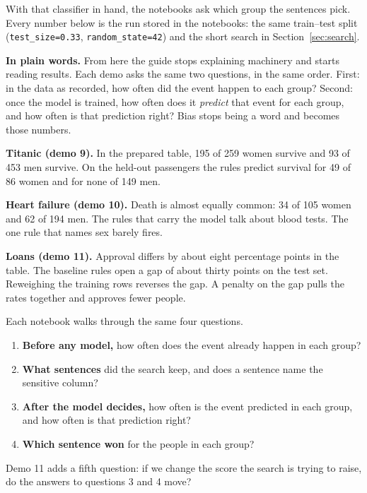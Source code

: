 \documentclass[11pt]{article}
\newcommand{\fn}[1]{\texttt{\small #1}}
\begin{document}
With that classifier in hand, the notebooks ask which group the sentences pick. Every number below is the run stored in the notebooks: the same train--test split (\fn{test\_size=0.33}, \fn{random\_state=42}) and the short search in Section~\ref{sec:search}.

\begin{plainwords}
\textbf{In plain words.} From here the guide stops explaining machinery and starts reading results. Each demo asks the same two questions, in the same order. First: in the data as recorded, how often did the event happen to each group? Second: once the model is trained, how often does it \emph{predict} that event for each group, and how often is that prediction right? Bias stops being a word and becomes those numbers.
\end{plainwords}

\begin{lesson}
\textbf{Titanic (demo 9).} In the prepared table, 195 of 259 women survive and 93 of 453 men survive. On the held-out passengers the rules predict survival for 49 of 86 women and for none of 149 men.

\textbf{Heart failure (demo 10).} Death is almost equally common: 34 of 105 women and 62 of 194 men. The rules that carry the model talk about blood tests. The one rule that names sex barely fires.

\textbf{Loans (demo 11).} Approval differs by about eight percentage points in the table. The baseline rules open a gap of about thirty points on the test set. Reweighing the training rows reverses the gap. A penalty on the gap pulls the rates together and approves fewer people.
\end{lesson}

Each notebook walks through the same four questions.

\begin{enumerate}
  \item \textbf{Before any model,} how often does the event already happen in each group?
  \item \textbf{What sentences} did the search keep, and does a sentence name the sensitive column?
  \item \textbf{After the model decides,} how often is the event predicted in each group, and how often is that prediction right?
  \item \textbf{Which sentence won} for the people in each group?
\end{enumerate}

Demo 11 adds a fifth question: if we change the score the search is trying to raise, do the answers to questions 3 and 4 move?
\end{document}
